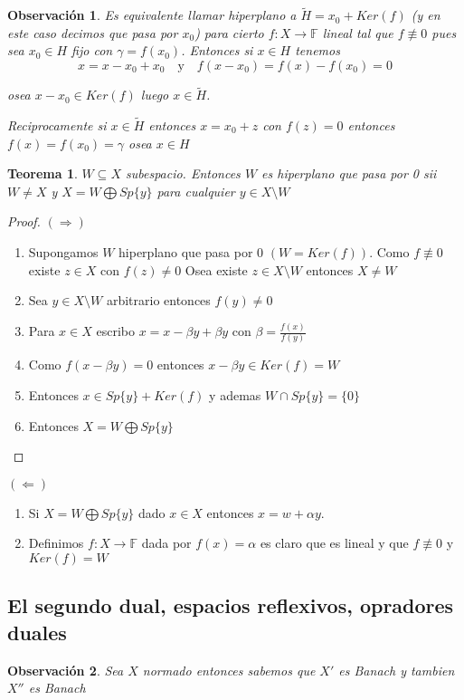 \documentclass[10pt]{extarticle}
\theoremstyle{break}
\newtheorem{theorem}{Teorema}[section]
\newtheorem*{remark}{Observación}
\theoremstyle{definition}
\begin{document}
\begin{remark}
Es equivalente llamar \emph{hiperplano} a $\tilde{H}=x_{0}+Ker(f)$ (y en este caso decimos que pasa por $x_{0}$) para cierto $f : X\rightarrow \mathbb{F}$ lineal tal que $f\not\equiv 0$ pues sea $x_{0}\in H$ fijo con $\gamma=f(x_{0})$.
Entonces si $x\in H$ tenemos
$$x=x-x_{0}+x_{0}\quad\text{y}\quad f(x-x_{0})=f(x)-f(x_{0})=0$$

osea $x-x_{0}\in Ker(f)$ luego $x\in \tilde{H}$.

Reciprocamente si $x\in \tilde{H}$ entonces $x=x_{0}+z$ con $f(z)=0$ entonces $f(x)=f(x_{0})=\gamma$ osea $x\in H$

\end{remark}

\begin{theorem}
$W\subseteq X$ subespacio. Entonces $W$ es hiperplano que pasa por 0 sii $W\neq X$ y $X=W\bigoplus Sp\{ y \}$ para cualquier $y\in X\setminus W$
\end{theorem}


\begin{proof}
$(\Rightarrow)$
\begin{enumerate}
\item
Supongamos $W$ hiperplano que pasa por $0$ $(W=Ker(f))$. Como $f \not\equiv 0$ existe $z\in X$ con $f(z)\neq 0$
Osea existe $z\in X\setminus W$ entonces $X\neq W$
\item
Sea $y\in X\setminus W$ arbitrario entonces $f(y)\neq 0$
\item
Para $x\in X$ escribo $x=x-\beta y+\beta y$ con $\beta= \frac{f(x)}{f(y)}$
\item
Como $f(x-\beta y)=0$ entonces $x-\beta y\in Ker(f)=W$
\item
Entonces $x\in Sp\{ y \}+Ker(f)$ y ademas $W\cap Sp\{ y \}=\{ 0 \}$
\item
Entonces $X=W\bigoplus Sp\{ y \}$
\end{enumerate}
\end{proof}

$(\Leftarrow)$
\begin{enumerate}
\item
Si $X=W\bigoplus Sp\{ y \}$ dado $x\in X$ entonces $x=w+\alpha y$.
\item
Definimos $f : X\rightarrow \mathbb{F}$ dada por $f(x)=\alpha$ es claro que es lineal y que $f\not\equiv 0$ y $Ker(f)=W$
\end{enumerate}


\subsection{El segundo dual, espacios reflexivos, opradores duales}
\begin{remark}
Sea $X$ normado entonces sabemos que $X'$ es Banach y tambien $X''$ es Banach
\end{remark}
\end{document}
